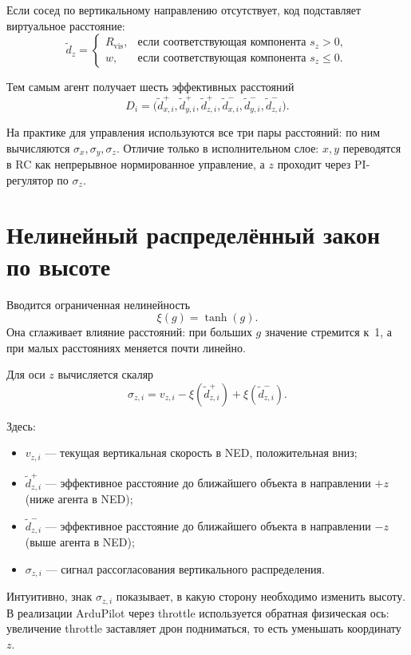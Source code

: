 \documentclass[a4paper,11pt]{article}
\begin{document}
Если сосед по вертикальному направлению отсутствует, код подставляет
виртуальное расстояние:
\[
  \tilde d_z =
  \begin{cases}
    R_{\mathrm{vis}}, & \text{если соответствующая компонента } s_z > 0,\\
    w, & \text{если соответствующая компонента } s_z \le 0.
  \end{cases}
\]

Тем самым агент получает шесть эффективных расстояний
\[
  D_i =
  \bigl(
  \tilde d_{x,i}^{+},
  \tilde d_{y,i}^{+},
  \tilde d_{z,i}^{+},
  \tilde d_{x,i}^{-},
  \tilde d_{y,i}^{-},
  \tilde d_{z,i}^{-}
  \bigr).
\]

На практике для управления используются все три пары расстояний:
по ним вычисляются $\sigma_x,\sigma_y,\sigma_z$. Отличие только в
исполнительном слое: $x,y$ переводятся в RC как непрерывное нормированное управление,
а $z$ проходит через PI-регулятор по $\sigma_z$.

\section{Нелинейный распределённый закон по высоте}

Вводится ограниченная нелинейность
\[
  \xi(g)=\tanh(g).
\]
Она сглаживает влияние расстояний: при больших $g$ значение стремится к~1,
а при малых расстояниях меняется почти линейно.

Для оси $z$ вычисляется скаляр
\[
  \sigma_{z,i}
  =
  v_{z,i}
  -
  \xi(\tilde d_{z,i}^{+})
  +
  \xi(\tilde d_{z,i}^{-}).
\]

Здесь:
\begin{itemize}
  \item $v_{z,i}$ --- текущая вертикальная скорость в NED, положительная вниз;
  \item $\tilde d_{z,i}^{+}$ --- эффективное расстояние до ближайшего объекта
  в направлении $+z$ (ниже агента в NED);
  \item $\tilde d_{z,i}^{-}$ --- эффективное расстояние до ближайшего объекта
  в направлении $-z$ (выше агента в NED);
  \item $\sigma_{z,i}$ --- сигнал рассогласования вертикального распределения.
\end{itemize}

Интуитивно, знак $\sigma_{z,i}$ показывает, в какую сторону необходимо
изменить высоту. В реализации ArduPilot через throttle используется обратная
физическая ось: увеличение throttle заставляет дрон подниматься, то есть
уменьшать координату $z$.
\end{document}
